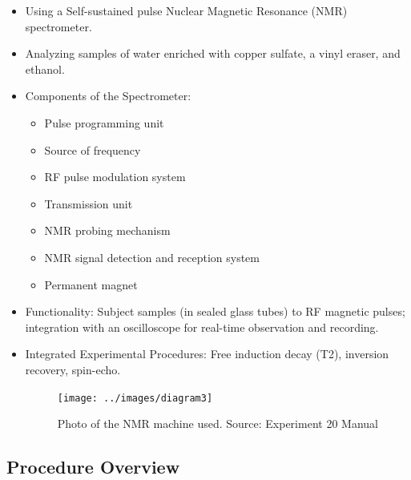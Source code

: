 \documentclass{article}
\begin{document}
\begin{itemize}
    \item Using a Self-sustained pulse Nuclear Magnetic Resonance (NMR) spectrometer.
    \item Analyzing samples of water enriched with copper sulfate, a vinyl eraser, and ethanol.
    \item Components of the Spectrometer:
    \begin{itemize}
        \item Pulse programming unit
        \item Source of frequency
        \item RF pulse modulation system
        \item Transmission unit
        \item NMR probing mechanism
        \item NMR signal detection and reception system
        \item Permanent magnet
    \end{itemize}
    \item Functionality: Subject samples (in sealed glass tubes) to RF magnetic pulses; integration with an oscilloscope for real-time observation and recording.
    \item Integrated Experimental Procedures: Free induction decay (T2), inversion recovery, spin-echo.
    \begin{figure}[h]
    \centering
    \texttt{[image: ../images/diagram3]}
    \caption{Photo of the NMR machine used. Source: Experiment 20 Manual}
    \label{fig:diagram3}
    \end{figure}
\end{itemize}

\subsection*{Procedure Overview}
\end{document}
